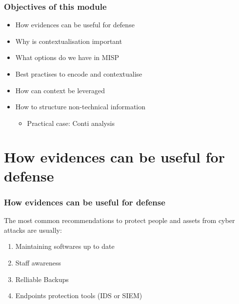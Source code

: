 
\begin{frame}[t,plain]
\titlepage
\end{frame}

\begin{frame}
    \frametitle{Objectives of this module}
    \begin{itemize}
        \item How evidences can be useful for defense
        \item Why is contextualisation important
        \item What options do we have in MISP
        \item Best practises to encode and contextualise
        \item How can context be leveraged
        \item How to structure non-technical information
        \begin{itemize}
            \item Practical case: Conti analysis
        \end{itemize}
    \end{itemize}
\end{frame}

\section{How evidences can be useful for defense}
\begin{frame}
    \frametitle{How evidences can be useful for defense}
    The most common recommendations to protect people and assets from cyber attacks are usually:
    \begin{enumerate}
        \item Maintaining softwares up to date
        \item Staff awareness
        \item Relliable Backups
        \item Endpoints protection tools (IDS or SIEM)
    \end{enumerate}


\end{frame}

